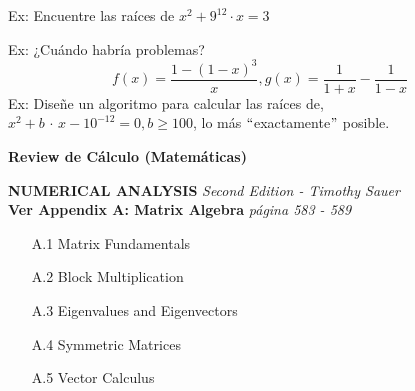\newpage
Ex: Encuentre las raíces de $\displaystyle{x^{2} + 9^{12}\cdot x = 3}$

\newpage
Ex: ¿Cuándo habría problemas?
$$
f(x)= \frac{1-(1-x)^{3}}{x}, g(x) = \frac{1}{1+x}-\frac{1}{1-x}
$$
\newpage
Ex: Diseñe un algoritmo para calcular las raíces de,\, $x^{2} + b\,\cdot\,x - 10^{-12} = 0, b \geqslant 100$, lo más $``$exactamente$"$ posible.\\
\vspace{10cm}
\begin{center}
\textbf{{\Huge Review de Cálculo (Matemáticas)}}\\
\end{center}

\vspace{3mm}

\begin{flushleft}
\textbf{\Large{NUMERICAL ANALYSIS}} \emph{Second Edition - Timothy Sauer}\\
\vspace{5mm}
\textbf{\Large{Ver Appendix A: Matrix Algebra}} \emph{página 583 - 589}
\end{flushleft}
\begin{itemize}
	\item[A.1] Matrix Fundamentals
	\item[A.2] Block Multiplication
	\item[A.3] Eigenvalues and Eigenvectors
	\item[A.4] Symmetric Matrices
	\item[A.5] Vector Calculus
\end{itemize}

\pagebreak